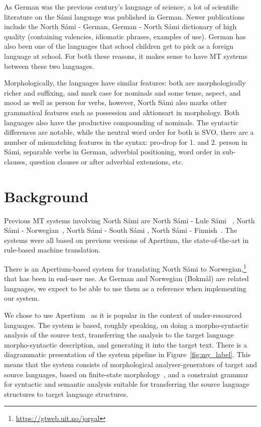\documentclass{flammie}
\begin{document}
As German was the previous century's language of science, a lot of scientific
literature on the Sámi language was published in German. Newer publications
include the North Sámi - German, German - North Sámi dictionary
\cite{Sammallahti2006} of high quality (containing valencies, idiomatic phrases,
examples of use).  German has also been one of the languages that school
children get to pick as a foreign language at school.  For both these reasons,
it makes sense to have MT systems between these two languages.

Morphologically, the languages have similar features: both are morphologically
richer and suffixing, and mark case for nominals and some tense, aspect, and
mood as well as person for verbs, however, North Sámi also marks other
grammatical features such as possession and aktionsart in morphology. Both
languages also have the productive compounding of nominals.  The syntactic
differences are notable, while the neutral word order for both is SVO, there are
a number of mismatching features in the syntax: pro-drop for 1. and 2. person in
Sámi, separable verbs in German, adverbial positioning, word order in
sub-clauses, question clauses or after adverbial extensions, etc.

\section{Background}

Previous MT systems involving North Sámi are North Sámi - Lule
Sámi~\cite{tyers2009dpm} \cite{Wiechetek2010}, North Sámi -
Norwegian~\cite{trosterud2012evaluating}, North Sámi - South Sámi
\cite{Antonsen2016ANS}, North Sámi - Finnish~\cite{pirinen-etal-2017-north}.
The systems were all based on previous versions of Apertium, the
state-of-the-art in rule-based machine translation.

There is an Apertium-based system for translating North Sámi to
Norwegian,\footnote{\url{https://gtweb.uit.no/jorgal}} that has been in end-user
use.  As German and Norwegian (Bokmål) are related languages, we expect to be
able to use them as a reference when implementing our system.


We chose to use Apertium~\cite{khanna2021apertium} as it is popular in the
context of under-resourced languages.  The system is based, roughly speaking, on
doing a morpho-syntactic analysis of the source text, transferring the analysis
to the target language morpho-syntactic description, and generating it into the
target text.  There is a diagrammatic presentation of the system pipeline in
Figure~\ref{fig:my_label}.  This means that the system consists of morphological
analyser-generators of target and source languages, based on finite-state
morphology~\cite{Beesley2003}, and a constraint
grammar~\cite{karlsson1990constraint,Didriksen2016} for syntactic and semantic
analysis suitable for transferring the source language structures to target
language structures.
\end{document}
